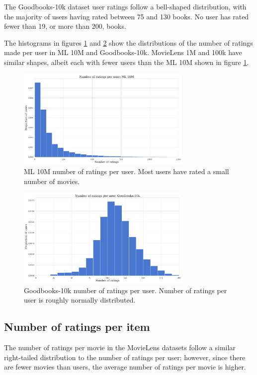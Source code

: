 The Goodbooks-10k dataset user ratings follow a bell-shaped distribution, with the majority of users having rated between 75 and 130 books. No user has rated fewer than 19, or more than 200, books.

The histograms in figures \ref{fig:ML10M-users} and \ref{fig:goodbooks-users} show the distributions of the number of ratings made per user in ML 10M and Goodbooks-10k. MovieLens 1M and 100k have similar shapes, albeit each with fewer users than the ML 10M shown in figure \ref{fig:ML10M-users}.

\begin{figure}[H]
\centering
\includegraphics[width=0.75\textwidth]{Figures/3_ratings-distributions/ml_10m_user-ratings.pdf}
\caption{ML 10M number of ratings per user. Most users have rated a small number of movies.}
\label{fig:ML10M-users}
\end{figure}

\begin{figure}[H]
\centering
\includegraphics[width=0.75\textwidth]{Figures/3_ratings-distributions/goodbooks_user-ratings.pdf}
\caption{Goodbooks-10k number of ratings per user. Number of ratings per user is roughly normally distributed.}
\label{fig:goodbooks-users}
\end{figure}

\subsection{Number of ratings per item}
The number of ratings per movie in the MovieLens datasets follow a similar right-tailed distribution to the number of ratings per user; however, since there are fewer movies than users, the average number of ratings per movie is higher.


